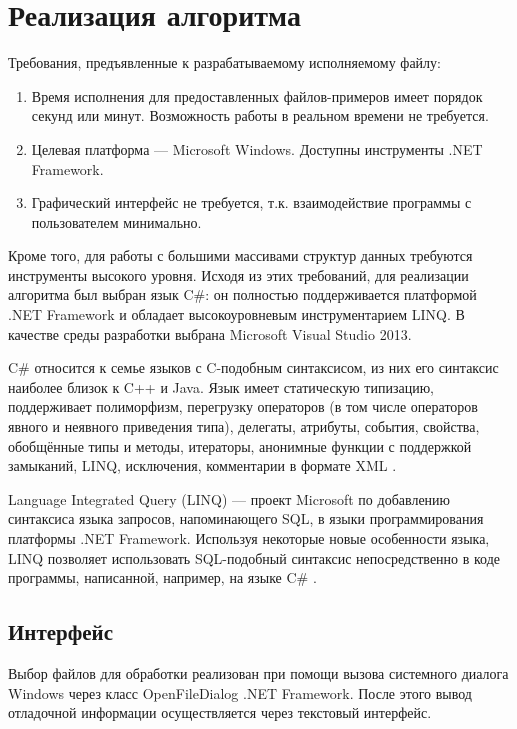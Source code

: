 \section{Реализация алгоритма}
\label{}

Требования, предъявленные к разрабатываемому исполняемому файлу:
\begin{enumerate}
\item Время исполнения для предоставленных файлов-примеров имеет порядок секунд или минут. Возможность работы в реальном времени не требуется.
\item Целевая платформа --- Microsoft Windows. Доступны инструменты .NET Framework.
\item Графический интерфейс не требуется, т.к. взаимодействие программы с пользователем минимально.
\end{enumerate}

Кроме того, для работы с большими массивами структур данных требуются инструменты высокого уровня. Исходя из этих требований, для реализации алгоритма был выбран язык C\#: он полностью поддерживается платформой .NET Framework и обладает высокоуровневым инструментарием LINQ. В качестве среды разработки выбрана Microsoft Visual Studio 2013.

C\# относится к семье языков с C-подобным синтаксисом, из них его синтаксис наиболее близок к C++ и Java. Язык имеет статическую типизацию, поддерживает полиморфизм, перегрузку операторов (в том числе операторов явного и неявного приведения типа), делегаты, атрибуты, события, свойства, обобщённые типы и методы, итераторы, анонимные функции с поддержкой замыканий, LINQ, исключения, комментарии в формате XML \cite{noauthor_iso/iec_nodate}.

Language Integrated Query (LINQ) — проект Microsoft по добавлению синтаксиса языка запросов, напоминающего SQL, в языки программирования платформы .NET Framework. Используя некоторые новые особенности языка, LINQ позволяет использовать SQL-подобный синтаксис непосредственно в коде программы, написанной, например, на языке C\# \cite{cheney_practical_2013}.

\subsection{Интерфейс}
\label{}

Выбор файлов для обработки реализован при помощи вызова системного диалога Windows через класс OpenFileDialog .NET Framework. После этого вывод отладочной информации осуществляется через текстовый интерфейс.

